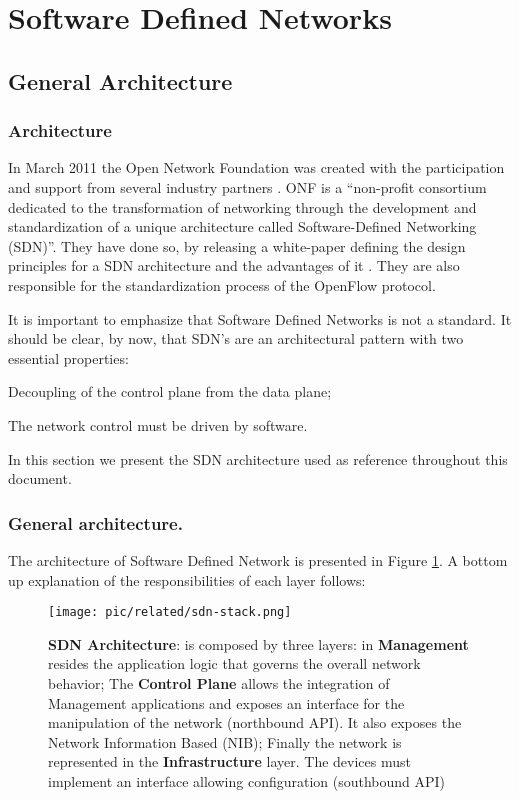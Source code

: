 \section{Software Defined Networks}
\glsresetall
\label{sec:background:sdn}

\subsection{General Architecture}

\subsubsection{Architecture}
In March 2011 the Open Network Foundation was created with the
participation and support from several industry partners \cite{onf}. ONF  is a ``non-profit consortium
dedicated to the transformation of networking through the development
and standardization of a unique architecture called Software-Defined
Networking (SDN)''. They have done so, by releasing a white-paper
defining the design principles for a SDN architecture and the
advantages of it \cite{ONF:2012ui}. They are also responsible for the standardization
process of the OpenFlow protocol.

It is important to emphasize that Software Defined Networks is not a
standard. It should be
clear, by now, that SDN's are an architectural pattern with two
essential properties:

\begin{itemize*}
\item Decoupling of the control plane from the data plane;
\item The network control must be driven by software.
\end{itemize*}

In this section we present the SDN architecture used as reference throughout this document.  

\subsubsection{General architecture.} The architecture of Software Defined Network is presented in Figure
\ref{fig:sdn-stack}. A bottom up explanation of the responsibilities of
each layer follows:

\begin{figure}
  \centering 
  \footnotesize
  \texttt{[image: pic/related/sdn-stack.png]}
  \caption[SDN Architecture]{\textbf{SDN Architecture}: is composed by three
    layers: in \textbf{Management} resides the application
    logic that governs the overall network behavior; The
    \textbf{Control Plane}   allows the integration
    of  Management applications and exposes an interface for the
    manipulation of the network (northbound API). It also exposes the Network
    Information Based (NIB); Finally the network is
    represented in the \textbf{Infrastructure} layer. The devices must
  implement an interface allowing configuration (southbound API)}
  \label{fig:sdn-stack}
\end{figure}

